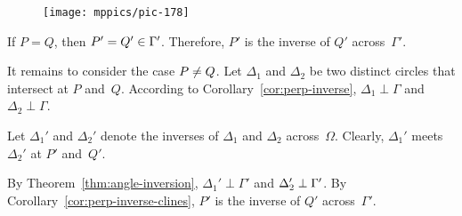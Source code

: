 {

\begin{wrapfigure}{r}{45mm}
\vskip-6mm
\centering
\texttt{[image: mppics/pic-178]}
\end{wrapfigure}

If $P=Q$, then $P'=Q'\in\Gamma'$. 
Therefore, $P'$ is the inverse of $Q'$ across~$\Gamma'$.

It remains to consider the case $P\ne Q$. 
Let $\Delta_1$ and $\Delta_2$ be two distinct circles that intersect at $P$ and~$Q$.
According to Corollary~\ref{cor:perp-inverse}, 
$\Delta_1\perp\Gamma$ and $\Delta_2\perp\Gamma$.

Let $\Delta_1'$ and $\Delta_2'$ denote the inverses of $\Delta_1$ and $\Delta_2$ across~$\Omega$.
Clearly, $\Delta_1'$ meets $\Delta_2'$ at $P'$ and~$Q'$.

By Theorem~\ref{thm:angle-inversion},  $\Delta_1'\perp\Gamma'$ and $\Delta_2'\perp\Gamma'$.
By Corollary~\ref{cor:perp-inverse-clines}, $P'$ is the inverse of $Q'$ across~$\Gamma'$.
\qeds

}
